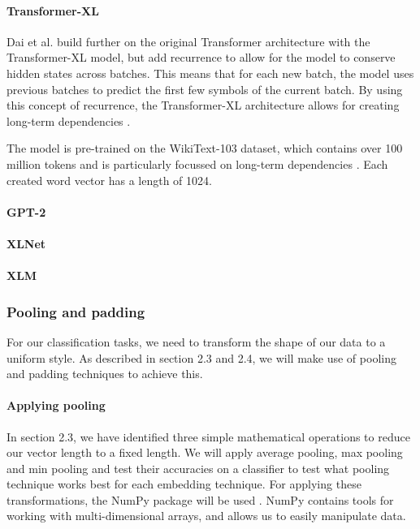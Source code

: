 \paragraph{Transformer-XL}
Dai et al. build further on the original Transformer architecture with the Transformer-XL model, but add recurrence to allow for the model to conserve hidden states across batches.
This means that for each new batch, the model uses previous batches to predict the first few symbols of the current batch.
By using this concept of recurrence, the Transformer-XL architecture allows for creating long-term dependencies \cite{dai2019}. 

The model is pre-trained on the WikiText-103 dataset, which contains over 100 million tokens and is particularly focussed on long-term dependencies \cite{merity2017}. 
Each created word vector has a length of 1024. 

\paragraph{GPT-2}

\paragraph{XLNet}

\paragraph{XLM}

\subsubsection{Pooling and padding}
For our classification tasks, we need to transform the shape of our data to a uniform style.
As described in section 2.3 and 2.4, we will make use of pooling and padding techniques to achieve this.

\paragraph{Applying pooling}
In section 2.3, we have identified three simple mathematical operations to reduce our vector length to a fixed length.
We will apply average pooling, max pooling and min pooling and test their accuracies on a classifier to test what pooling technique works best for each embedding technique.
For applying these transformations, the NumPy package will be used \cite{numpy}.
NumPy contains tools for working with multi-dimensional arrays, and allows us to easily manipulate data. 

